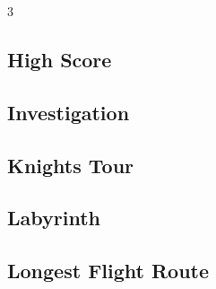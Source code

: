 \documentclass[8pt]{extarticle}
\begin{document}
\begin{multicols*}{3}
\subsection{High Score}
\begin{caixaenunciado}

\end{caixaenunciado}
\vspace{0.3cm}


\subsection{Investigation}
\begin{caixaenunciado}

\end{caixaenunciado}
\vspace{0.3cm}


\subsection{Knights Tour}
\begin{caixaenunciado}

\end{caixaenunciado}
\vspace{0.3cm}


\subsection{Labyrinth}
\begin{caixaenunciado}

\end{caixaenunciado}
\vspace{0.3cm}


\subsection{Longest Flight Route}
\begin{caixaenunciado}

\end{caixaenunciado}
\vspace{0.3cm}



\end{multicols*}
\end{document}
